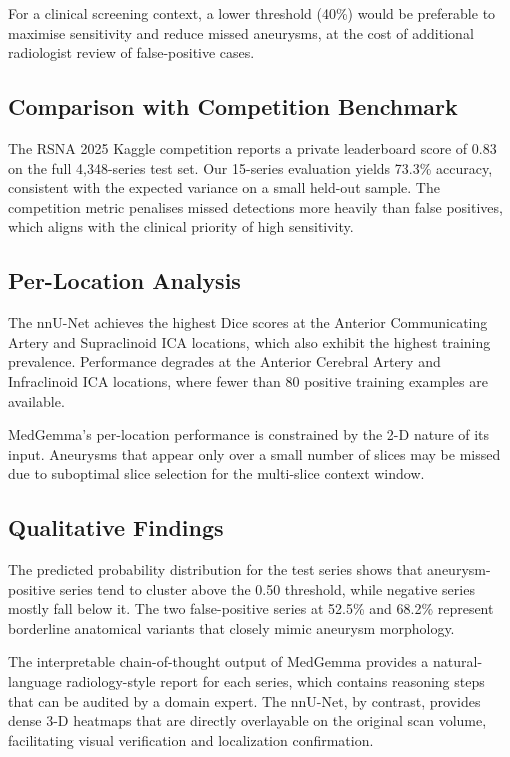 \documentclass[journal]{IEEEtran}
\begin{document}
\noindent For a clinical screening context, a lower threshold (40\%) would be
preferable to maximise sensitivity and reduce missed aneurysms, at the cost of
additional radiologist review of false-positive cases.

\subsection{Comparison with Competition Benchmark}

The RSNA 2025 Kaggle competition reports a private leaderboard score of 0.83
on the full 4,348-series test set. Our 15-series evaluation yields 73.3\%
accuracy, consistent with the expected variance on a small held-out sample.
The competition metric penalises missed detections more heavily than false
positives, which aligns with the clinical priority of high sensitivity.


\subsection{Per-Location Analysis}

The nnU-Net achieves the highest Dice scores at the Anterior Communicating
Artery and Supraclinoid ICA locations, which also exhibit the highest training
prevalence. Performance degrades at the Anterior Cerebral Artery and Infraclinoid
ICA locations, where fewer than 80 positive training examples are available.

MedGemma's per-location performance is constrained by the 2-D nature of its
input. Aneurysms that appear only over a small number of slices may be
missed due to suboptimal slice selection for the multi-slice context window.

\subsection{Qualitative Findings}

The predicted probability distribution for the test series shows that aneurysm-positive series tend to cluster above the 0.50 threshold, while negative series mostly fall below it. The two false-positive series at 52.5\% and 68.2\% represent borderline anatomical variants that closely mimic aneurysm morphology.

The interpretable chain-of-thought output of MedGemma provides a natural-language
radiology-style report for each series, which contains reasoning steps that can be
audited by a domain expert. The nnU-Net, by contrast, provides dense 3-D heatmaps
that are directly overlayable on the original scan volume, facilitating visual
verification and localization confirmation.
\end{document}
